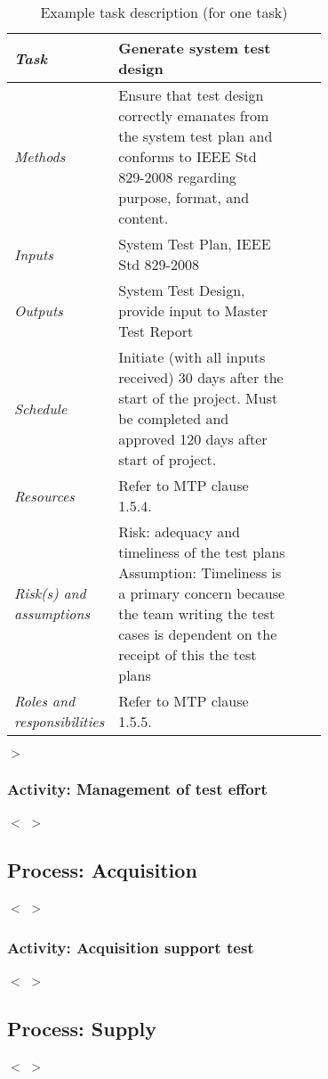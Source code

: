 \documentclass{scrreprt}
\begin{document}
	\begin{table}
		\caption{Example task description (for one task)}
		\label{tab:example-task-description}
		\centering
		\begin{tabular}{@{}lp{0.7\linewidth}lp{}}
			\toprule
			\emph{Task} & Generate system test design \\
			\midrule
			\emph{Methods} & Ensure that test design correctly emanates from the system test plan and conforms
			to IEEE Std 829-2008 regarding purpose, format, and content.\\
			\emph{Inputs} & System Test Plan, IEEE Std 829-2008 \\
			\emph{Outputs} & System Test Design, provide input to Master Test Report \\
			\emph{Schedule} & Initiate (with all inputs received) 30 days after the start of the project. Must be
			completed and approved 120 days after start of project. \\
			\emph{Resources} & Refer to MTP clause 1.5.4. \\
			\emph{Risk(s) and assumptions} & Risk: adequacy and timeliness of the test plans
			Assumption: Timeliness is a primary concern because the team writing the test
			cases is dependent on the receipt of this the test plans \\
			\emph{Roles and responsibilities} & Refer to MTP clause 1.5.5. \\
			\bottomrule
		\end{tabular}
	\end{table}
	$>$
	
	\subsubsection{Activity: Management of test effort}
	$<$ $>$
	
	\subsection{Process: Acquisition}
	$<$ $>$
	
	\subsubsection{Activity: Acquisition support test}
	$<$ $>$
	
	\subsection{Process: Supply}
	$<$ $>$
	
\end{document}
